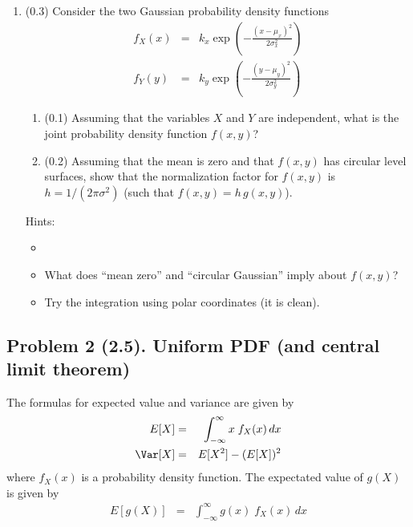 \documentclass[11pt,titlepage,fleqn]{article}
\begin{document}
\begin{enumerate}
\item (0.3) Consider the two Gaussian probability density functions
%
\begin{eqnarray}
f_X(x) &=& k_x \exp\left(-\frac{(x-\mu_x)^2}{2\sigma_x^2} \right)
\\
f_Y(y) &=& k_y \exp\left(-\frac{(y-\mu_y)^2}{2\sigma_y^2} \right)
\end{eqnarray}
%
\begin{enumerate}
\item (0.1) Assuming that the variables $X$ and $Y$ are independent, what is the joint probability density function $f(x,y)$?
\item (0.2) Assuming that the mean is zero and that $f(x,y)$ has circular level surfaces, show that the normalization factor for $f(x,y)$ is $h = 1/(2\pi\sigma^2)$ (such that $f(x,y) = h\,g(x,y)$).
\end{enumerate}

Hints:
\begin{itemize}
\item \citet[][eq. B.28]{AsterE2}
\item What does ``mean zero'' and ``circular Gaussian'' imply about $f(x,y)$?
\item Try the integration using polar coordinates (it is clean).
\end{itemize}


\end{enumerate}


\subsection*{Problem 2 (2.5). Uniform PDF (and central limit theorem)}

The formulas for expected value and variance are given by
%
\begin{eqnarray}
E[X] &=& \int_{-\infty}^{\infty} x\;f_X(x) \,dx
\label{EX}
\\
\Var[X] &=& E[X^2] - (E[X])^2
\label{var}
\end{eqnarray}
%
where $f_X(x)$ is a probability density function. The expectated value of $g(X)$ is given by
%
\begin{eqnarray}
E[g(X)] &=& \int_{-\infty}^{\infty} g(x)\;f_X(x) \,dx
\label{Egx}
\end{eqnarray}

\end{document}
